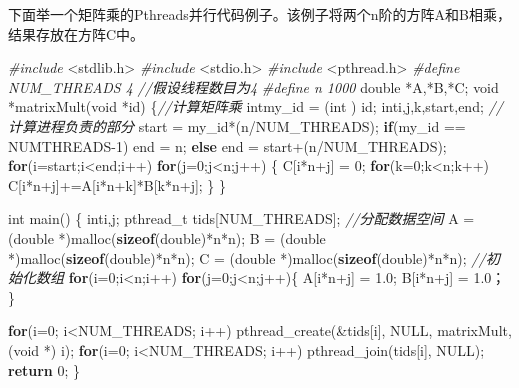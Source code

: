 \documentclass[]{ctexbook}
\newenvironment{Shaded}{\begin{snugshade}}{\end{snugshade}}
\newcommand{\CommentTok}[1]{\textcolor[rgb]{0.56,0.35,0.01}{\textit{#1}}}
\newcommand{\ControlFlowTok}[1]{\textcolor[rgb]{0.13,0.29,0.53}{\textbf{#1}}}
\newcommand{\DataTypeTok}[1]{\textcolor[rgb]{0.13,0.29,0.53}{#1}}
\newcommand{\DecValTok}[1]{\textcolor[rgb]{0.00,0.00,0.81}{#1}}
\newcommand{\FloatTok}[1]{\textcolor[rgb]{0.00,0.00,0.81}{#1}}
\newcommand{\ImportTok}[1]{#1}
\newcommand{\KeywordTok}[1]{\textcolor[rgb]{0.13,0.29,0.53}{\textbf{#1}}}
\newcommand{\NormalTok}[1]{#1}
\newcommand{\PreprocessorTok}[1]{\textcolor[rgb]{0.56,0.35,0.01}{\textit{#1}}}
\begin{document}
下面举一个矩阵乘的Pthreads并行代码例子。该例子将两个n阶的方阵A和B相乘，结果存放在方阵C中。

\begin{Shaded}
\begin{Highlighting}[]
\PreprocessorTok{\#include }\ImportTok{\textless{}stdlib.h\textgreater{}}
\PreprocessorTok{\#include }\ImportTok{\textless{}stdio.h\textgreater{}}
\PreprocessorTok{\#include }\ImportTok{\textless{}pthread.h\textgreater{}}
\PreprocessorTok{\#define NUM\_THREADS 4 }\CommentTok{//假设线程数目为4}
\PreprocessorTok{\#define n 1000}
\DataTypeTok{double}\NormalTok{ *A,*B,*C;}
\DataTypeTok{void}\NormalTok{ *matrixMult(}\DataTypeTok{void}\NormalTok{ *id) \{}\CommentTok{//计算矩阵乘}
\NormalTok{    intmy\_id = (}\DataTypeTok{int}\NormalTok{ ) id;}
\NormalTok{    inti,j,k,start,end;}
    \CommentTok{//计算进程负责的部分}
\NormalTok{    start = my\_id*(n/NUM\_THREADS);}
    \ControlFlowTok{if}\NormalTok{(my\_id == NUMTHREADS{-}}\DecValTok{1}\NormalTok{)}
\NormalTok{    end = n;}
    \ControlFlowTok{else}
\NormalTok{    end = start+(n/NUM\_THREADS);}
    \ControlFlowTok{for}\NormalTok{(i=start;i\textless{}end;i++)}
    \ControlFlowTok{for}\NormalTok{(j=}\DecValTok{0}\NormalTok{;j\textless{}n;j++) \{}
\NormalTok{        C[i*n+j] = }\DecValTok{0}\NormalTok{;}
        \ControlFlowTok{for}\NormalTok{(k=}\DecValTok{0}\NormalTok{;k\textless{}n;k++)}
\NormalTok{            C[i*n+j]+=A[i*n+k]*B[k*n+j];}
\NormalTok{        \}}
\NormalTok{    \}}

\DataTypeTok{int}\NormalTok{ main() \{}
\NormalTok{    inti,j;}
\NormalTok{    pthread\_t tids[NUM\_THREADS];}
    \CommentTok{//分配数据空间}
\NormalTok{    A = (}\DataTypeTok{double}\NormalTok{ *)malloc(}\KeywordTok{sizeof}\NormalTok{(}\DataTypeTok{double}\NormalTok{)*n*n);}
\NormalTok{    B = (}\DataTypeTok{double}\NormalTok{ *)malloc(}\KeywordTok{sizeof}\NormalTok{(}\DataTypeTok{double}\NormalTok{)*n*n);}
\NormalTok{    C = (}\DataTypeTok{double}\NormalTok{ *)malloc(}\KeywordTok{sizeof}\NormalTok{(}\DataTypeTok{double}\NormalTok{)*n*n);}
    \CommentTok{//初始化数组}
    \ControlFlowTok{for}\NormalTok{(i=}\DecValTok{0}\NormalTok{;i\textless{}n;i++)}
    \ControlFlowTok{for}\NormalTok{(j=}\DecValTok{0}\NormalTok{;j\textless{}n;j++)\{ }
\NormalTok{        A[i*n+j] = }\FloatTok{1.0}\NormalTok{;}
\NormalTok{        B[i*n+j] = }\FloatTok{1.0}\NormalTok{；}
\NormalTok{    \}}

    \ControlFlowTok{for}\NormalTok{(i=}\DecValTok{0}\NormalTok{; i\textless{}NUM\_THREADS; i++)}
\NormalTok{        pthread\_create(\&tids[i], NULL, matrixMult, (}\DataTypeTok{void}\NormalTok{ *) i);}
    \ControlFlowTok{for}\NormalTok{(i=}\DecValTok{0}\NormalTok{; i\textless{}NUM\_THREADS; i++)}
\NormalTok{        pthread\_join(tids[i], NULL);}
    \ControlFlowTok{return} \DecValTok{0}\NormalTok{;}
\NormalTok{\}}
\end{Highlighting}
\end{Shaded}
\end{document}
